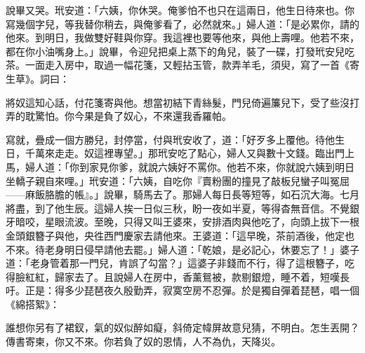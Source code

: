 說畢又哭。玳安道：「六姨，你休哭。俺爹怕不也只在這兩日，他生日待來也。你寫幾個字兒，等我替你稍去，與俺爹看了，必然就來。」婦人道：「是必累你，請的他來。到明日，我做雙好鞋與你穿。我這裡也要等他來，與他上壽哩。他若不來，都在你小油嘴身上。」說畢，令迎兒把桌上蒸下的角兒，裝了一碟，打發玳安兒吃茶。一面走入房中，取過一幅花箋，又輕拈玉管，款弄羊毛，須臾，寫了一首《寄生草》。詞曰：

\begin{myquote} 
將奴這知心話，付花箋寄與他。想當初結下青絲髮，門兒倚遍簾兒下，受了些沒打弄的耽驚怕。你今果是負了奴心，不來還我香羅帕。
\end{myquote} 

寫就，疊成一個方勝兒，封停當，付與玳安收了，道：「好歹多上覆他。待他生日，千萬來走走。奴這裡專望。」那玳安吃了點心，婦人又與數十文錢。臨出門上馬，婦人道：「你到家見你爹，就說六姨好不罵你。{}他若不來，你就說六姨到明日坐轎子親自來哩。」玳安道：「六姨，自吃你『賣粉團的撞見了敲板兒蠻子叫冤屈——麻飯胳膽的帳』。」{}說畢，騎馬去了。那婦人每日長等短等，如石沉大海。七月將盡，到了他生辰。這婦人挨一日似三秋，盼一夜如半夏，等得杳無音信。不覺銀牙暗咬，星眼流波。至晚，只得又叫王婆來，安排酒肉與他吃了，向頭上拔下一根金頭銀簪子與他，央徃西門慶家去請他來。王婆道：「這早晚，茶前酒後，他定也不來。待老身明日侵早請他去罷。」婦人道：「乾娘，是必記心，休要忘了！」婆子道：「老身管着那一門兒，{}肯誤了勾當？」這婆子非錢而不行，得了這根簪子，吃得臉紅紅，歸家去了。且說婦人在房中，香薰鴛被，款剔銀燈，睡不着，短嘆長吁。正是：得多少琵琶夜久殷勤弄，寂寞空房不忍彈。於是獨自彈着琵琶，唱一個《綿搭絮》：

\begin{myquote} 
誰想你另有了裙釵，氣的奴似醉如癡，斜倚定幃屏故意兒猜，不明白。怎生丟開？傳書寄柬，你又不來。你若負了奴的恩情，人不為仇，天降災。
\end{myquote} 


